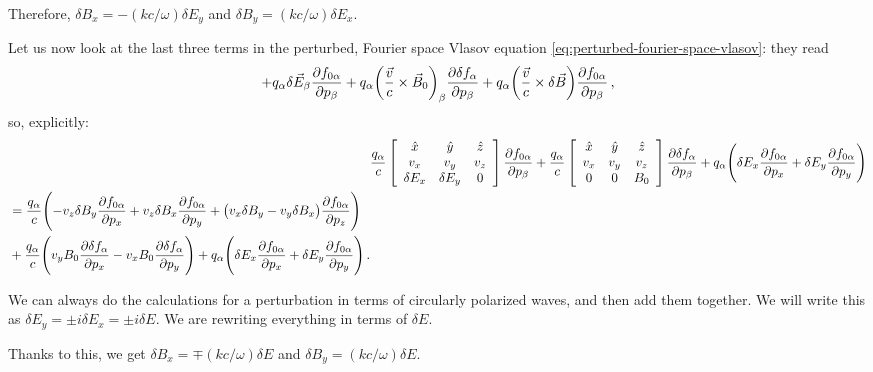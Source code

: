 \documentclass[main.tex]{subfiles}
\begin{document}
Therefore, \(\delta B_x = - (kc / \omega ) \delta E_y\) and \(\delta B_y = (kc / \omega ) \delta E_x\). 

Let us now look at the last three terms in the perturbed, Fourier space Vlasov equation \eqref{eq:perturbed-fourier-space-vlasov}: they read 
%
\begin{align}
+ q_\alpha \delta \vec{E}_\beta \pdv{f_{0 \alpha }}{p_\beta } 
+ q_\alpha \qty( \frac{\vec{v}}{c} \times \vec{B}_0)_\beta \pdv{ \delta f_\alpha }{p_\beta }
+ q_\alpha \qty( \frac{\vec{v}}{c} \times \delta \vec{B}) 
\pdv{f_{0 \alpha }}{p_\beta }
\,,
\end{align}
%
so, explicitly: 
%
\begin{align}
& \frac{q_\alpha}{c} \left[\begin{array}{ccc}
\hat{x} & \hat{y} & \hat{z} \\ 
v_x & v_y & v_z \\ 
\delta E_x & \delta E_y & 0
\end{array}\right]
\pdv{f_{0 \alpha }}{p_\beta }
+ \frac{q_\alpha}{c} \left[\begin{array}{ccc}
\hat{x} & \hat{y} & \hat{z} \\ 
v_x & v_y & v_z \\ 
0 & 0 & B_0 
\end{array}\right]
\pdv{ \delta f_\alpha }{p_\beta }
+ q_\alpha
\qty(\delta E_x \pdv{f_{0 \alpha }}{p_x} + \delta E_y \pdv{f_{0 \alpha }}{p_y})  \\
\begin{split}
&= \frac{q_\alpha}{c} \qty( - v_z \delta B_y \pdv{f_{0 \alpha }}{p_x} + v_z \delta B_x \pdv{f_{0 \alpha }}{p_y} + \qty(v_x \delta B_y - v_y \delta B_x) \pdv{f_{0\alpha} }{p_z}) 
\\ 
& + \frac{q_\alpha}{c} \qty(
    v_y B_0 \pdv{ \delta f_\alpha }{p_x} - v_x B_0 \pdv{ \delta f_\alpha }{p_y}
)
+ q_\alpha \qty(
    \delta E_x \pdv{f_{0 \alpha }}{p_x} +
    \delta E_y \pdv{f_{0 \alpha }}{p_y}
)
\,.
\end{split}
\end{align}

We can always do the calculations for a perturbation in terms of circularly polarized waves, and then add them together. 
We will write this as \(\delta E_y = \pm i \delta E_x = \pm i \delta E\). 
We are rewriting everything in terms of \(\delta E\).  

Thanks to this, we get \(\delta B_x = \mp (k c / \omega ) \delta E\) and  \(\delta B_y = (kc / \omega ) \delta E\). 
\end{document}
